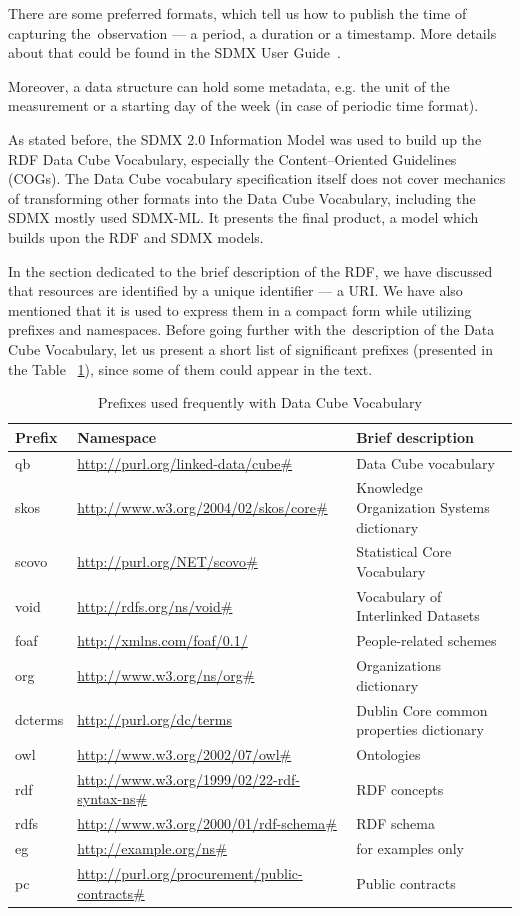 There are some preferred formats, which tell us how to publish the time of capturing
the~observation --- a period, a duration or a timestamp. More details about that could be found
in the SDMX User Guide~\cite{sdmxuserguide}.

Moreover, a data structure can hold some metadata, e.g. the unit of the measurement
or a starting day of the week (in case of periodic time format).

As stated before, the SDMX 2.0 Information Model was used to build up the
RDF Data Cube Vocabulary, especially the Content--Oriented Guidelines (COGs). The Data Cube
vocabulary specification itself does not cover mechanics of transforming other formats
into the Data Cube Vocabulary, including the SDMX mostly used SDMX-ML. It presents the final
product, a model which builds upon the RDF and SDMX models.

In the section dedicated to the brief description of the RDF, we have discussed that resources
are identified by a unique identifier --- a URI. We have also mentioned that it is used to express
them in a compact form while utilizing prefixes and namespaces. Before going further with
the~description of the Data Cube Vocabulary, let us present a short list of significant prefixes
(presented in the Table ~\ref{tab:sdmxprefixes}),
since some of them could appear in the text.

\begin{table}[h]\footnotesize
  \caption{Prefixes used frequently with Data Cube Vocabulary}
  \label{tab:sdmxprefixes}
\scriptsize\begin{tabular}{l l l}
Prefix & Namespace & Brief description \\
\hline
qb & \url{http://purl.org/linked-data/cube#} & Data Cube vocabulary \\
skos & \url{http://www.w3.org/2004/02/skos/core#} & Knowledge Organization Systems dictionary \\
scovo & \url{http://purl.org/NET/scovo#} & Statistical Core Vocabulary \\
void & \url{http://rdfs.org/ns/void#} & Vocabulary of Interlinked Datasets \\
foaf & \url{http://xmlns.com/foaf/0.1/} & People-related schemes \\
org & \url{http://www.w3.org/ns/org#} & Organizations dictionary \\
dcterms & \url{http://purl.org/dc/terms} & Dublin Core common properties dictionary \\
owl & \url{http://www.w3.org/2002/07/owl#} & Ontologies \\
rdf & \url{http://www.w3.org/1999/02/22-rdf-syntax-ns#} & RDF concepts \\
rdfs & \url{http://www.w3.org/2000/01/rdf-schema#} & RDF schema \\
eg & \url{http://example.org/ns#} & for examples only \\
pc & \url{http://purl.org/procurement/public-contracts#} & Public contracts \\
\end{tabular}\end{table}

